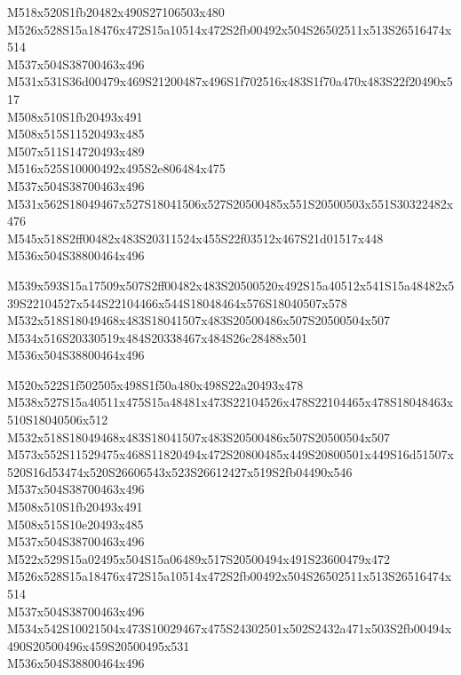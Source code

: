 \documentclass{article}
\begin{document}
\begin{multicols}{5}
\begin{center}
M518x520S1fb20482x490S27106503x480 %
\\M526x528S15a18476x472S15a10514x472S2fb00492x504S26502511x513S26516474x514 %
\\M537x504S38700463x496 %
\\M531x531S36d00479x469S21200487x496S1f702516x483S1f70a470x483S22f20490x517 %
\\M508x510S1fb20493x491 %
\\M508x515S11520493x485 %
\\M507x511S14720493x489 %
\\M516x525S10000492x495S2e806484x475 %
\\M537x504S38700463x496 %
\\M531x562S18049467x527S18041506x527S20500485x551S20500503x551S30322482x476 %
\\M545x518S2ff00482x483S20311524x455S22f03512x467S21d01517x448 %
\\M536x504S38800464x496 %

M539x593S15a17509x507S2ff00482x483S20500520x492S15a40512x541S15a48482x539S22104527x544S22104466x544S18048464x576S18040507x578 %
\\M532x518S18049468x483S18041507x483S20500486x507S20500504x507 %
\\M534x516S20330519x484S20338467x484S26c28488x501 %
\\M536x504S38800464x496 %

M520x522S1f502505x498S1f50a480x498S22a20493x478 %
\\M538x527S15a40511x475S15a48481x473S22104526x478S22104465x478S18048463x510S18040506x512 %
\\M532x518S18049468x483S18041507x483S20500486x507S20500504x507 %
\\M573x552S11529475x468S11820494x472S20800485x449S20800501x449S16d51507x520S16d53474x520S26606543x523S26612427x519S2fb04490x546 %
\\M537x504S38700463x496 %
\\M508x510S1fb20493x491 %
\\M508x515S10e20493x485 %
\\M537x504S38700463x496 %
\\M522x529S15a02495x504S15a06489x517S20500494x491S23600479x472 %
\\M526x528S15a18476x472S15a10514x472S2fb00492x504S26502511x513S26516474x514 %
\\M537x504S38700463x496 %
\\M534x542S10021504x473S10029467x475S24302501x502S2432a471x503S2fb00494x490S20500496x459S20500495x531 %
\\M536x504S38800464x496 %

\end{center}
\end{multicols}
\end{document}
